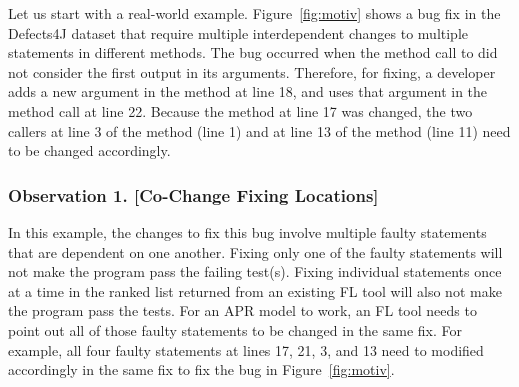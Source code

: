 Let us start with a real-world example.
Figure~\ref{fig:motiv} shows a bug fix in the Defects4J dataset that
require multiple interdependent changes to multiple statements in
different methods. The bug occurred when the method call to
 did not consider the first output in its
arguments. Therefore, for fixing, a developer adds a new argument in
the method  at line 18, and uses that argument in the
method call  at line
22. Because the method  at line 17 was changed, the two
callers at line 3 of the method  (line 1) and at line
13 of the method  (line 11) need to be changed
accordingly.






\subsubsection{{\bf Observation 1. [Co-Change Fixing Locations]}}
In this example, the changes to fix this bug involve multiple faulty
statements that are dependent on one another. Fixing only one of the
faulty statements will not make the program pass the failing
test(s). Fixing individual statements once at a time in the ranked
list returned from an existing FL tool will also not make the program
pass the tests. For an APR model to work, an FL tool needs to point
out all of those faulty statements to be changed in the same fix.  For
example, all four faulty statements at lines 17, 21, 3, and 13 need to
modified accordingly in the same fix to fix the bug in
Figure~\ref{fig:motiv}.

